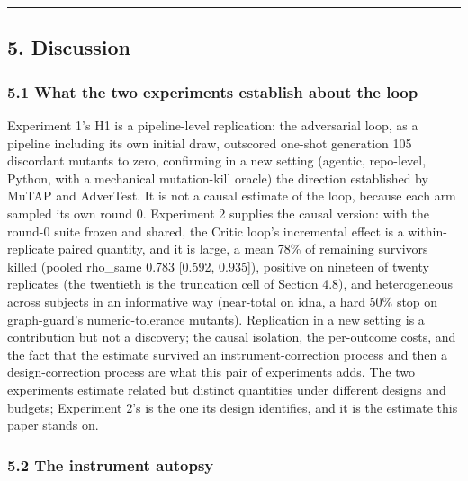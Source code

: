 \documentclass[
  11pt,
]{article}
\begin{document}
\begin{center}\rule{0.5\linewidth}{0.5pt}\end{center}

\subsection{5. Discussion}\label{discussion}

\subsubsection{5.1 What the two experiments establish about the
loop}\label{what-the-two-experiments-establish-about-the-loop}

Experiment 1's H1 is a pipeline-level replication: the adversarial loop,
as a pipeline including its own initial draw, outscored one-shot
generation 105 discordant mutants to zero, confirming in a new setting
(agentic, repo-level, Python, with a mechanical mutation-kill oracle)
the direction established by MuTAP and AdverTest. It is not a causal
estimate of the loop, because each arm sampled its own round 0.
Experiment 2 supplies the causal version: with the round-0 suite frozen
and shared, the Critic loop's incremental effect is a within-replicate
paired quantity, and it is large, a mean 78\% of remaining survivors
killed (pooled rho\_same 0.783 {[}0.592, 0.935{]}), positive on nineteen
of twenty replicates (the twentieth is the truncation cell of Section
4.8), and heterogeneous across subjects in an informative way
(near-total on idna, a hard 50\% stop on graph-guard's numeric-tolerance
mutants). Replication in a new setting is a contribution but not a
discovery; the causal isolation, the per-outcome costs, and the fact
that the estimate survived an instrument-correction process and then a
design-correction process are what this pair of experiments adds. The
two experiments estimate related but distinct quantities under different
designs and budgets; Experiment 2's is the one its design identifies,
and it is the estimate this paper stands on.

\subsubsection{5.2 The instrument autopsy}\label{the-instrument-autopsy}
\end{document}
